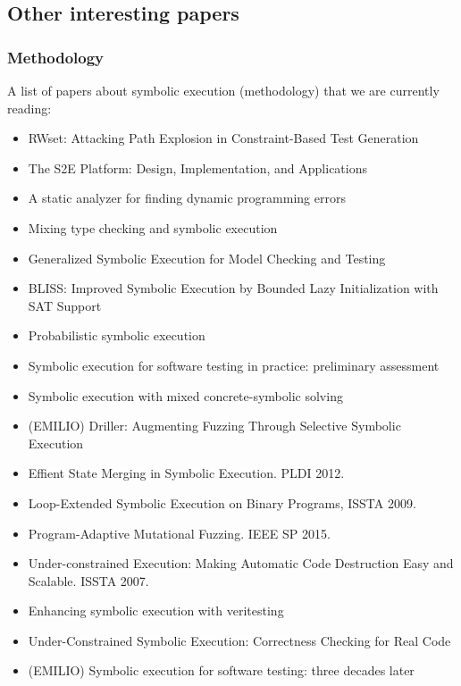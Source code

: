 \subsection{Other interesting papers}

\subsubsection{Methodology}
A list of papers about symbolic execution (methodology) that we are currently reading:
\begin{itemize}
  \item \cite{BCE-TACAS08} RWset: Attacking Path Explosion in Constraint-Based Test Generation
  \item \cite{CKC-TOCS12} The S2E Platform: Design, Implementation, and Applications
  \item \cite{BPS-SPE00} A static analyzer for finding dynamic programming errors
  \item \cite{KCF-PLDI10} Mixing type checking and symbolic execution
  \item \cite{KPV-TACAS03} Generalized Symbolic Execution for Model Checking and Testing
  \item \cite{BLISS-TSE15} BLISS: Improved Symbolic Execution by Bounded Lazy Initialization with SAT Support
  \item \cite{GDV-ISSTA12} Probabilistic symbolic execution
  \item \cite{CGK-ICSE11} Symbolic execution for software testing in practice: preliminary assessment
  \item \cite{PRV-ISSTA11} Symbolic execution with mixed concrete-symbolic solving
  \item (EMILIO) \cite{DRILLER-NDSS16} Driller: Augmenting Fuzzing Through Selective Symbolic Execution 
  \item Effient State Merging in Symbolic Execution. PLDI 2012.
  \item Loop-Extended Symbolic Execution on Binary Programs, ISSTA 2009.
  \item Program-Adaptive Mutational Fuzzing. IEEE SP 2015.
  \item Under-constrained Execution: Making Automatic Code Destruction Easy and Scalable. ISSTA 2007.
  \item \cite{VERITESTING-ICSE14} Enhancing symbolic execution with veritesting
  \item \cite{RE-USEC15} Under-Constrained Symbolic Execution: Correctness Checking for Real Code
  \item (EMILIO) \cite{CS-ACM13} Symbolic execution for software testing: three decades later
\end{itemize}

